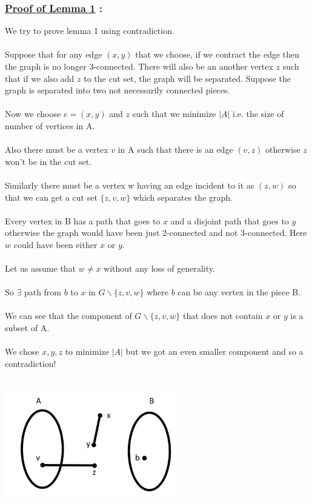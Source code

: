 \documentclass{article}
\begin{document}
    \subsubsection*{\underline{\textbf{Proof of Lemma 1}} :}
    We try to prove lemma 1 using contradiction.
    \\\\
    Suppose that for any edge $(x,y)$ that we choose, if we contract the edge then the graph is no longer 3-connected. There will also be an another vertex $z$ such that if we also add $z$ to the cut set, the graph will be separated. Suppose the graph is separated into two not necessarily connected pieces.
    \\\\
    Now we choose $e = (x,y)$ and $z$ such that we minimize $|A|$ i.e. the size of number of vertices in A.
    \\\\
    Also there must be a vertex $v$ in A such that there is an edge $(v,z)$ otherwise $z$ won't be in the cut set.
    \\\\
    Similarly there must be a vertex w having an edge incident to it as $(z,w)$ so that we can get a cut set $ \{z,v,w\} $ which separates the graph.
    \\\\
    Every vertex in B has a path that goes to $x$ and a disjoint path that goes to $y$ otherwise the graph would have been just 2-connected and not 3-connected. Here $w$ could have been either $x$ or $y$.  
    \\\\
    Let us assume that $w \neq x$ without any loss of generality.
    \\\\
    So $\exists$  path from $b$ to $x$ in $G \backslash \{ z,v,w \}$ where $b$ can be any vertex in the piece B.
    \\\\
    We can see that the component of $G \backslash \{ z,v,w \}$ that does not contain $x$ or $y$ is a subset of A.
    \\\\
    We chose $x,y,z$ to minimize $|A|$ but we got an even smaller component and so a contradiction!
    \\\\
    \centerline{\includegraphics[width=3in]{Images/lemma1.jpg}} 
    \\\\
    
\end{document}
